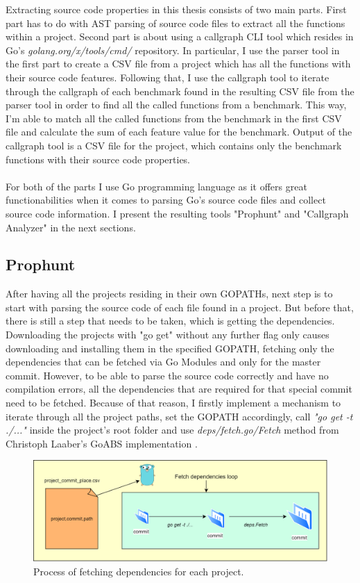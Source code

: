 \documentclass{seal_thesis}
\begin{document}
\noindent Extracting source code properties in this thesis consists of two main parts. First part has to do with AST parsing of source code files to extract all the functions within a project. Second part is about using a callgraph CLI tool which resides in Go's \textit{golang.org/x/tools/cmd/} repository\cite{callgraphtool}. In particular, I use the parser tool in the first part to create a CSV file from a project which has all the functions with their source code features. Following that, I use the callgraph tool to iterate through the callgraph of each benchmark found in the resulting CSV file from the parser tool in order to find all the called functions from a benchmark. This way, I'm able to match all the called functions from the benchmark in the first CSV file and calculate the sum of each feature value for the benchmark. Output of the callgraph tool is a CSV file for the project, which contains only the benchmark functions with their source code properties.\\
\\
For both of the parts I use Go programming language as it offers great functionabilities when it comes to parsing Go's source code files and collect source code information. I present the resulting tools "Prophunt" and "Callgraph Analyzer" in the next sections.

\subsection{Prophunt}
\label{Prophunt}
After having all the projects residing in their own GOPATHs, next step is to start with parsing the source code of each file found in a project. But before that, there is still a step that needs to be taken, which is getting the dependencies. Downloading the projects with "go get" without any further flag only causes downloading and installing them in the specified GOPATH, fetching only the dependencies that can be fetched via Go Modules and only for the master commit. However, to be able to parse the source code correctly and have no compilation errors, all the dependencies that are required for that special commit need to be fetched. Because of that reason, I firstly implement a mechanism to iterate through all the project paths, set the GOPATH accordingly, call \textit{"go get -t ./..."} inside the project's root folder and use \textit{deps/fetch.go/Fetch} method from Christoph Laaber's GoABS implementation \cite{sealuzh/goabs}.

\begin{figure}[H]
	\centering
	\includegraphics[width=\linewidth]{fetchdeps}
	\caption{Process of fetching dependencies for each project.}
	\label{fig:fetchdeps}
\end{figure}
\end{document}

